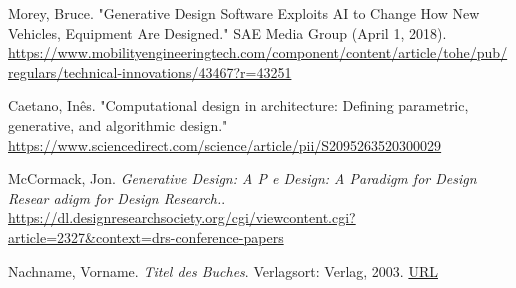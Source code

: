 \begin{thebibliography}{99}

     Morey, Bruce. "Generative Design Software Exploits AI to Change How New Vehicles, Equipment Are Designed." SAE Media Group (April 1, 2018). \url{https://www.mobilityengineeringtech.com/component/content/article/tohe/pub/regulars/technical-innovations/43467?r=43251}

      Caetano, Inês. "Computational design in architecture: Defining parametric, generative, and algorithmic design." \url{https://www.sciencedirect.com/science/article/pii/S2095263520300029}
        
     McCormack, Jon. \textit{Generative Design: A P e Design: A Paradigm for Design Resear adigm for Design Research.}. \url{https://dl.designresearchsociety.org/cgi/viewcontent.cgi?article=2327&context=drs-conference-papers}

     Nachname, Vorname. \textit{Titel des Buches}. Verlagsort: Verlag, 2003. \url{URL}

\end{thebibliography}
